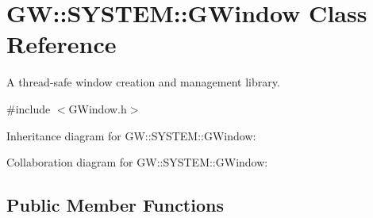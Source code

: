 \hypertarget{classGW_1_1SYSTEM_1_1GWindow}{}\section{GW\+::S\+Y\+S\+T\+EM\+::G\+Window Class Reference}
\label{classGW_1_1SYSTEM_1_1GWindow}


A thread-\/safe window creation and management library.  




{\ttfamily \#include $<$G\+Window.\+h$>$}



Inheritance diagram for GW\+::S\+Y\+S\+T\+EM\+::G\+Window\+:


Collaboration diagram for GW\+::S\+Y\+S\+T\+EM\+::G\+Window\+:
\subsection*{Public Member Functions}

